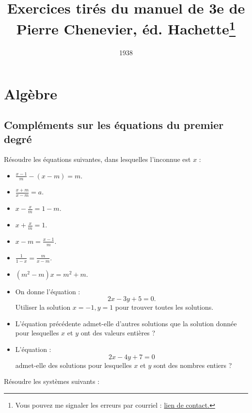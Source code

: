 \documentclass[12 pt]{report}
\author{ }
\title{\Large Exercices tirés du manuel de 3e de Pierre Chenevier, éd. Hachette\footnote{Vous pouvez me signaler les erreurs par courriel : \href{mailto:leturcq.d@orange.fr}{lien de contact.} 
	}
	}
\date{1938}
\theoremstyle{plain}
\newcounter{n}
\renewcommand{\it}{\item[$\mathbf{\then}.$]\stepcounter{n} }
\newenvironment{calcul}{\item[$\mathbf{\then}.$] \stepcounter{n}\hfil $\displaystyle  }{.$\hfil   }
\begin{document}
	\maketitle
 \part{Algèbre}
 \chapter{Compléments sur les équations du premier degré}
 
Résoudre les équations suivantes, dans lesquelles l'inconnue est $x$ : 
 \begin{itemize}
\begin{calcul}\frac{x-1}m - (x-m) = m  \end{calcul}
\begin{calcul} \frac{x+m}{x-m} = a \end{calcul}
\begin{calcul} x - \frac{x}m = 1 - m \end{calcul}
\begin{calcul} x + \frac{x}m = 1\end{calcul}
\begin{calcul} x - m = \frac{x-1}m \end{calcul}
\begin{calcul} \frac1{1-x} = \frac{m}{x-m} \end{calcul}
\begin{calcul} (m^2- m ) x = m^2 + m \end{calcul}
\it On donne l'équation : \[ 2x - 3 y + 5 = 0.\]
Utiliser la solution $x= -1, y= 1$ pour trouver toutes les solutions. 
\it L'équation précédente admet-elle d'autres solutions que la solution donnée pour lesquelles $x$ et $y$ ont des valeurs entières ? 
\it L'équation : \[ 2x - 4y + 7 = 0\] admet-elle des solutions pour lesquelles $x$ et $y$ sont des nombres entiers ? 
 \end{itemize}
 Résoudre les systèmes suivants :
\end{document}
